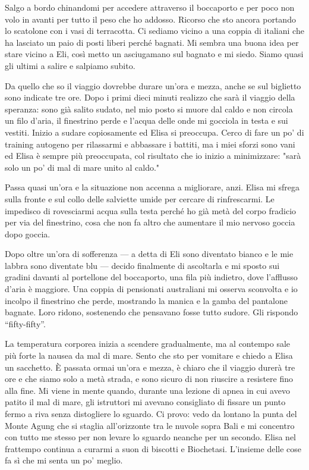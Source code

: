 Salgo a bordo chinandomi per accedere attraverso il boccaporto e per poco non volo in avanti per tutto il peso che ho addosso. Ricorso che sto ancora portando lo scatolone con i vasi di terracotta. Ci sediamo vicino a una coppia di italiani che ha lasciato un paio di posti liberi perché bagnati. Mi sembra una buona idea per stare vicino a Eli, così metto un asciugamano sul bagnato e mi siedo. Siamo quasi gli ultimi a salire e salpiamo subito.

Da quello che so il viaggio dovrebbe durare un'ora e mezza, anche se sul biglietto sono indicate tre ore. Dopo i primi dieci minuti realizzo che sarà il viaggio della speranza: sono già salito sudato, nel mio posto si muore dal caldo e non circola un filo d'aria, il finestrino perde e l'acqua delle onde mi gocciola in testa e sui vestiti. Inizio a sudare copiosamente ed Elisa si preoccupa. Cerco di fare un po' di training autogeno per rilassarmi e abbassare i battiti, ma i miei sforzi sono vani ed Elisa è sempre più preoccupata, col risultato che io inizio a minimizzare: "sarà solo un po' di mal di mare unito al caldo."

Passa quasi un'ora e la situazione non accenna a migliorare, anzi. Elisa mi sfrega sulla fronte e sul collo delle salviette umide per cercare di rinfrescarmi. Le impedisco di rovesciarmi acqua sulla testa perché ho già metà del corpo fradicio per via del finestrino, cosa che non fa altro che aumentare il mio nervoso goccia dopo goccia.

Dopo oltre un'ora di sofferenza — a detta di Eli sono diventato bianco e le mie labbra sono diventate blu — decido finalmente di ascoltarla e mi sposto sui gradini davanti al portellone del boccaporto, una fila più indietro, dove l'afflusso d'aria è maggiore. Una coppia di pensionati australiani mi osserva sconvolta e io incolpo il finestrino che perde, mostrando la manica e la gamba del pantalone bagnate. Loro ridono, sostenendo che pensavano fosse tutto sudore. Gli rispondo “fifty-fifty”.

La temperatura corporea inizia a scendere gradualmente, ma al contempo sale più forte la nausea da mal di mare. Sento che sto per vomitare e chiedo a Elisa un sacchetto. È passata ormai un'ora e mezza, è chiaro che il viaggio durerà tre ore e che siamo solo a metà strada, e sono sicuro di non riuscire a resistere fino alla fine. Mi viene in mente quando, durante una lezione di apnea in cui avevo patito il mal di mare, gli istruttori mi avevano consigliato di fissare un punto fermo a riva senza distogliere lo sguardo. Ci provo: vedo da lontano la punta del Monte Agung che si staglia all'orizzonte tra le nuvole sopra Bali e mi concentro con tutto me stesso per non levare lo sguardo neanche per un secondo. Elisa nel frattempo continua a curarmi a suon di biscotti e Biochetasi. L'insieme delle cose fa sì che mi senta un po' meglio.

